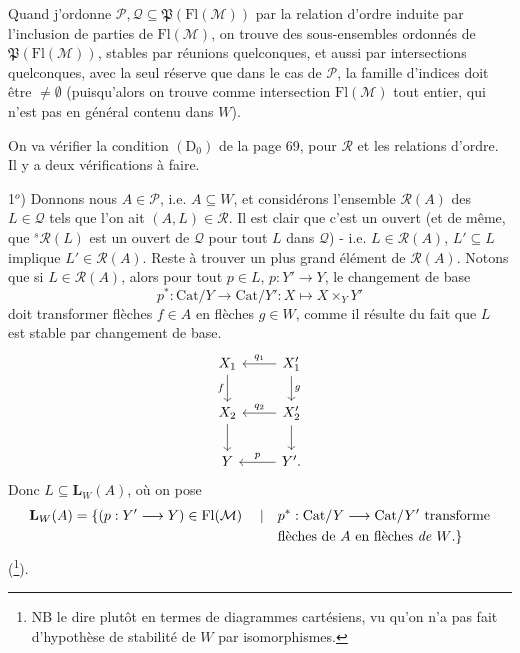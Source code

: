\documentclass[11pt]{article}
\newcommand{\printedpage}[1]{\marginpar{\footnotesize p.~#1}}
\newcommand{\msp}[1]{\marginpar{\footnotesize [#1]}}
\newcommand{\Fl}{\mathrm{Fl}}
\newcommand{\Pf}{\mathfrak{P}}
\begin{document}
\msp{page 84}Quand j'ordonne $\mathcal{P},\mathcal{Q}\subseteq\Pf(\Fl(\mathcal{M}))$ par la relation d'ordre induite par l'inclusion de parties de $\Fl(\mathcal{M})$, on trouve des sous-ensembles ordonnés de $\Pf(\Fl(\mathcal{M}))$, stables par réunions quelconques, et aussi par intersections quelconques, avec la seul réserve que dans le cas de $\mathcal{P}$, la famille d'indices doit être $\neq\emptyset$ (puisqu'alors on trouve comme intersection $\Fl(\mathcal{M})$ tout entier, qui n'est pas en général contenu dans $W$). %

On va vérifier la condition $(\mathrm{D}_0)$ de la page 69, pour $\mathcal{R}$ et les relations d'ordre. Il y a deux vérifications à faire.

1$^{o}$) Donnons nous $A\in\mathcal{P}$, i.e. $A\subseteq W$, et considérons l'ensemble $\mathcal{R}(A)$ des $L\in\mathcal{Q}$ tels que l'on ait $(A,L)\in\mathcal{R}$. Il est clair que c'est un ouvert (et de même, que ${}^{s}\mathcal{R}(L)$ est un ouvert de $\mathcal{Q}$ pour tout $L$ dans $\mathcal{Q}$) - i.e. $L\in\mathcal{R}(A)$, $L'\subseteq L$ implique %
\printedpage{52}
$L'\in\mathcal{R}(A)$. Reste à trouver un plus grand élément de $\mathcal{R}(A)$. Notons que si $L\in\mathcal{R}(A)$, alors pour tout $p\in L$, $p : Y'\longrightarrow Y$, le changement de base
\[
p^{*} : \mathrm{Cat}/Y\longrightarrow\mathrm{Cat}/Y' : X\longmapsto X\times_{Y}Y'
\]
doit transformer flèches $f\in A$ en flèches $g\in W$, comme il résulte du fait que $L$ est stable par changement de base.
\[
\begin{tikzcd}
X_1 \arrow[d, "f"'] & X'_1 \arrow[l, "q_1"'] \arrow[d, "g"] \\
X_2 \arrow[d] & X'_2 \arrow[l, "q_2"'] \arrow[d] \\
Y & Y'. \arrow[l, "p"']
\end{tikzcd}
\]
Donc $L\subseteq\mathbf{L}_W(A)$, où on pose
\msp{page 85}
\[
\begin{aligned}
\mathbf{L}_W(A)=\{(p : Y'\longrightarrow Y)\in\Fl(\mathcal{M})\quad\mid\quad & p^{*} : \mathrm{Cat}/Y\longrightarrow\mathrm{Cat}/Y'\ \text{transforme}\\
& \text{flèches de $A$ en flèches \textit{de} $W$.}\}
\end{aligned}
\]
(\footnote{NB le dire plutôt en termes de diagrammes cartésiens, vu qu'on n'a pas fait d'hypothèse de stabilité de $W$ par isomorphismes.}).
\end{document}
